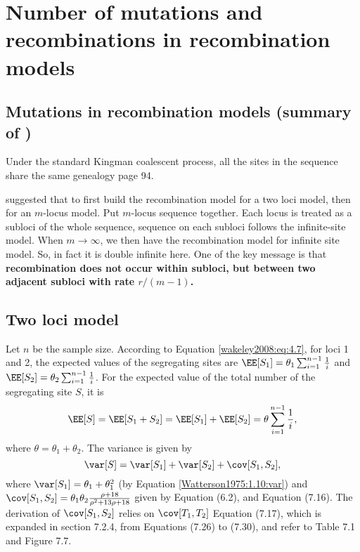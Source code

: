 \section{Number of mutations and recombinations in recombination models}
\subsection{Mutations in recombination models (summary of \citet{Hudson1983TPB})}
Under the standard Kingman coalescent process, all the sites in the sequence share the same genealogy \citep{Wakeley2008} page 94.

\citet{Hudson1983TPB} suggested that to first build the recombination model for a two loci model, then for an $m$-locus model. Put $m$-locus sequence together. Each locus is treated as a subloci of the whole sequence, sequence on each subloci follows the infinite-site model. When $m\rightarrow\infty$, we then have the recombination model for infinite site model. So, in fact it is double infinite here. One of the key message is that {\bf recombination does not occur within subloci, but between two adjacent subloci with rate $r/(m-1)$.}

\subsection{Two loci model} Let $n$ be the sample size. According to Equation \eqref{wakeley2008:eq:4.7}, for loci 1 and 2, the expected values of the segregating sites are $\EE[S_1]=\theta_1\sum_{i=1}^{n-1}\frac{1}{i}$ and $\EE[S_2]=\theta_2\sum_{i=1}^{n-1}\frac{1}{i}$. For the expected value of the total number of the segregating site $S$, it is 
$$
\EE[S]=\EE[S_1+S_2]=\EE[S_1]+\EE[S_2]=\theta\sum_{i=1}^{n-1}\frac{1}{i},
$$
where $\theta=\theta_1+\theta_2$.
The variance is given by 
$$\var[S]=\var[S_1]+\var[S_2]+\cov[S_1,S_2],$$
where $\var[S_1]=\theta_1+\theta_1^2$ (by Equation \eqref{Watterson1975:1.10:var}) and $\cov[S_1,S_2]=\theta_1\theta_2\frac{\rho+18}{\rho^2+13\rho+18}$ given by \citet{Griffiths1981} Equation (6.2), and \citet{Wakeley2008} Equation (7.16). The derivation of $\cov[S_1,S_2]$ relies on $\cov[T_1,T_2]$\citet{Wakeley2008} Equation (7.17), which is expanded in section 7.2.4, from Equations (7.26) to (7.30), and refer to Table 7.1 and Figure 7.7.


